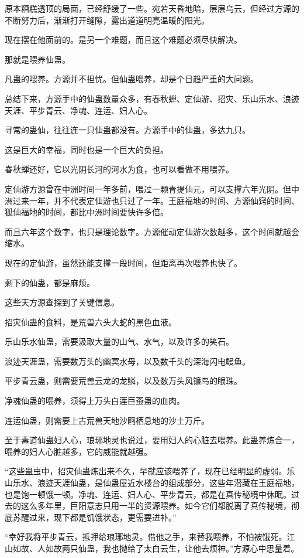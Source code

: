 \begin{this_body}
原本糟糕透顶的局面，已经舒缓了一些。宛若天昏地暗，层层乌云，但经过方源的不断努力后，渐渐打开缝隙，露出道道明亮温暖的阳光。

现在摆在他面前的。是另一个难题，而且这个难题必须尽快解决。

那就是喂养仙蛊。

凡蛊的喂养。方源并不担忧。但仙蛊喂养，却是个日趋严重的大问题。

总结下来，方源手中的仙蛊数量众多，有春秋蝉、定仙游、招灾、乐山乐水、浪迹天涯、平步青云、净魂、连运、妇人心。

寻常的蛊仙，往往连一只仙蛊都没有。方源手中的仙蛊，多达九只。

这是巨大的幸福，同时也是一个巨大的负担。

春秋蝉还好，它以光阴长河的河水为食，也可以看做不用喂养。

定仙游方源曾在中洲时间一年多前，喂过一颗青提仙元，可以支撑六年光阴。但中洲过来一年，并不代表定仙游也只过了一年。王庭福地的时间、方源仙窍的时间、狐仙福地的时间，都比中洲时间要快许多倍。

而且六年这个数字，也只是理论数字。方源催动定仙游次数越多，这个时间就越会缩水。

现在的定仙游，虽然还能支撑一段时间，但距离再次喂养也快了。

剩下的仙蛊，都是麻烦。

这些天方源查探到了关键信息。

招灾仙蛊的食料，是荒兽六头大蛇的黑色血液。

乐山乐水仙蛊，需要汲取大量的山气、水气，以及许多的笑石。

浪迹天涯蛊，需要数万头的幽冥水母，以及数千头的深海闪电鳗鱼。

平步青云蛊，则需要荒兽云龙的龙鳞，以及数万头风镰鸟的眼珠。

净魂仙蛊的喂养，须得上万头白莲巨蚕蛊的血肉。

连运仙蛊，则需要上古荒兽天地沙鸥栖息地的沙土万斤。

至于毒道仙蛊妇人心，琅琊地灵也说过，要用妇人的心脏去喂养。此蛊养炼合一，喂养的妇人心脏越多，它的威能就越强。

“这些蛊虫中，招灾仙蛊炼出来不久，早就应该喂养了，现在已经明显的虚弱。乐山乐水、浪迹天涯仙蛊，是仙蛊屋近水楼台的组成部分，这些年潜藏在王庭福地，也是饱一顿饿一顿。净魂、连运、妇人心、平步青云，都是在真传秘境中休眠。过去的这么多年里，巨阳意志只用一半的资源喂养。如今它们都脱离了真传秘境，彻底苏醒过来，现下都是饥饿状态，更需要进补。”

“幸好我将平步青云，抵押给琅琊地灵。借他之手，来替我喂养，不怕被饿死。江山如故、人如故两只仙蛊，我也抛给了太白云生，让他去烦神。”方源心中思量着。


\end{this_body}
